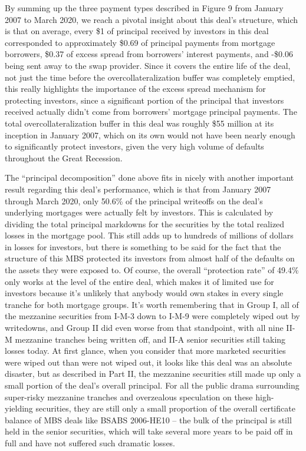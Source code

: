 \documentclass[12pt]{article}
\begin{document}
By summing up the three payment types described in Figure 9 from January 2007 to March 2020, we reach a pivotal insight about this deal’s structure, which is that on average, every \$1 of principal received by investors in this deal corresponded to approximately \$0.69 of principal payments from mortgage borrowers, \$0.37 of excess spread from borrowers’ interest payments, and -\$0.06 being sent away to the swap provider. Since it covers the entire life of the deal, not just the time before the overcollateralization buffer was completely emptied, this really highlights the importance of the excess spread mechanism for protecting investors, since a significant portion of the principal that investors received actually didn’t come from borrowers’ mortgage principal payments. The total overcollateralization buffer in this deal was roughly \$55 million at its inception in January 2007, which on its own would not have been nearly enough to significantly protect investors, given the very high volume of defaults throughout the Great Recession.

	The “principal decomposition” done above fits in nicely with another important result regarding this deal’s performance, which is that from January 2007 through March 2020, only 50.6\% of the principal writeoffs on the deal’s underlying mortgages were actually felt by investors. This is calculated by dividing the total principal markdowns for the securities by the total realized losses in the mortgage pool. This still adds up to hundreds of millions of dollars in losses for investors, but there is something to be said for the fact that the structure of this MBS protected its investors from almost half of the defaults on the assets they were exposed to.
Of course, the overall “protection rate” of 49.4\% only works at the level of the entire deal, which makes it of limited use for investors because it’s unlikely that anybody would own stakes in every single tranche for both mortgage groups. It’s worth remembering that in Group I, all of the mezzanine securities from I-M-3 down to I-M-9 were completely wiped out by writedowns, and Group II did even worse from that standpoint, with all nine II-M mezzanine tranches being written off, and II-A senior securities still taking losses today. At first glance, when you consider that more marketed securities were wiped out than were not wiped out, it looks like this deal was an absolute disaster, but as described in Part II, the mezzanine securities still made up only a small portion of the deal’s overall principal. For all the public drama surrounding super-risky mezzanine tranches and overzealous speculation on these high-yielding securities, they are still only a small proportion of the overall certificate balance of MBS deals like BSABS 2006-HE10 – the bulk of the principal is still held in the senior securities, which will take several more years to be paid off in full and have not suffered such dramatic losses.
\end{document}
